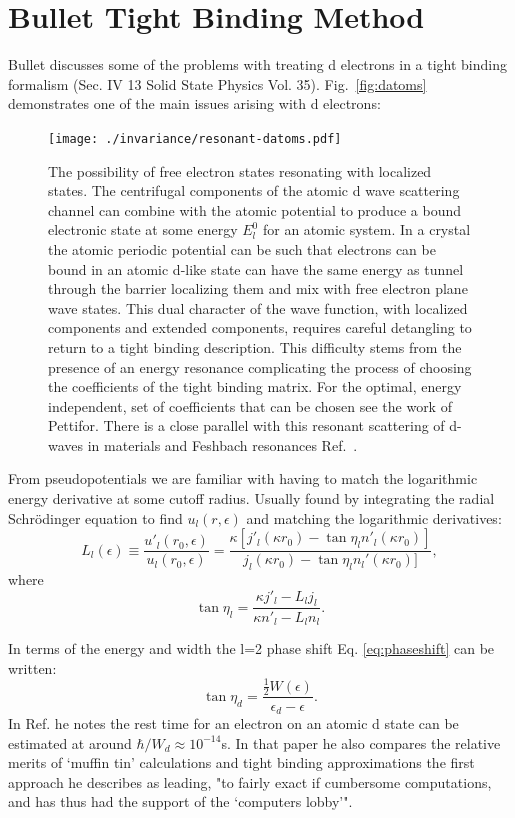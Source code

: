 \section{Bullet Tight Binding Method}
\label{sec:bullet}
Bullet discusses some of the problems with treating d electrons in a tight binding 
formalism (Sec. IV 13 Solid State Physics Vol. 35). Fig.~\ref{fig:datoms} demonstrates
one of the main issues arising with d electrons:
%
\begin{figure}
\texttt{[image: ./invariance/resonant-datoms.pdf]}
\caption{The possibility of free electron states resonating with localized states.
The centrifugal components of the atomic d wave scattering channel can combine with
the atomic potential to produce a bound electronic state at some energy $E^{0}_{l}$ for an atomic system.
In a crystal the atomic periodic potential can be such that electrons can be bound in an
atomic d-like state can have the same energy as tunnel through the barrier localizing them and mix with free electron 
plane wave states. This dual character of the wave function, with localized components and extended components, requires careful 
detangling to return to a tight binding description. This difficulty 
stems from the presence of an energy resonance 
complicating the process of choosing the coefficients of the tight binding matrix. 
For the optimal, energy independent, set of coefficients that can be 
chosen see the work of Pettifor. There is a close parallel with this resonant 
scattering of d-waves in materials and Feshbach resonances Ref.~\cite{chin10}.}
\end{figure}
%

From pseudopotentials we are familiar with having to match the logarithmic energy
derivative at some cutoff radius. Usually found by integrating the radial
Schr\"odinger equation to find $u_{l}(r,\epsilon)$ and matching the logarithmic derivatives:
%
\begin{equation}
L_{l}(\epsilon) \equiv \frac{u'_{l}(r_{0},\epsilon)}{u_{l}(r_{0},\epsilon)} = \frac{\kappa[j'_{l}
(\kappa r_{0}) - \tan \eta_{l} n'_{l}(\kappa r_{0})]} {j_{l}(\kappa r_{0}) - \tan \eta_{l} n_{l}'(\kappa r_{0})]},
\end{equation}
%
where
\begin{equation}
\label{eq:phaseshift}
\tan \eta_{l} = \frac{\kappa j'_{l} - L_{l}j_{l}}{\kappa n'_{l} - L_{l}n_{l}}.
\end{equation}

In terms of the energy and width the l=2 phase shift Eq. \ref{eq:phaseshift} 
can be written:
%
\begin{equation}
\label{eq:dshift}
\tan \eta_{d} = \frac{\frac{1}{2}W(\epsilon)}{\epsilon_{d}-\epsilon}.
\end{equation}
%
In Ref. \cite{friedel73} he notes the rest time for an electron on an atomic d state 
can be estimated at around $\hbar/W_{d}\approx 10^{-14}$s. In that paper he also
compares the relative merits of `muffin tin' calculations and tight binding approximations
the first approach he describes as leading, "to fairly exact if cumbersome
computations, and has thus had the support of the `computers lobby'".

